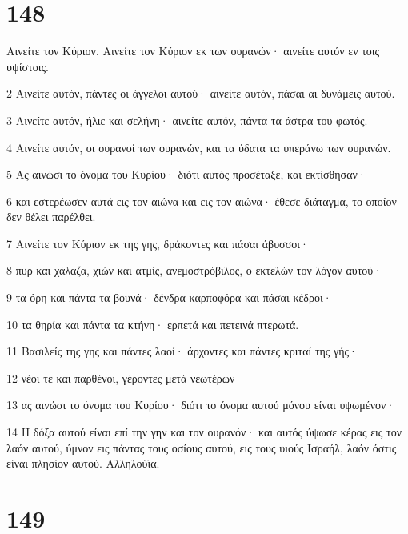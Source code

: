 \chapter{148}

\par Αινείτε τον Κύριον. Αινείτε τον Κύριον εκ των ουρανών· αινείτε αυτόν εν τοις υψίστοις.
\par 2 Αινείτε αυτόν, πάντες οι άγγελοι αυτού· αινείτε αυτόν, πάσαι αι δυνάμεις αυτού.
\par 3 Αινείτε αυτόν, ήλιε και σελήνη· αινείτε αυτόν, πάντα τα άστρα του φωτός.
\par 4 Αινείτε αυτόν, οι ουρανοί των ουρανών, και τα ύδατα τα υπεράνω των ουρανών.
\par 5 Ας αινώσι το όνομα του Κυρίου· διότι αυτός προσέταξε, και εκτίσθησαν·
\par 6 και εστερέωσεν αυτά εις τον αιώνα και εις τον αιώνα· έθεσε διάταγμα, το οποίον δεν θέλει παρέλθει.
\par 7 Αινείτε τον Κύριον εκ της γης, δράκοντες και πάσαι άβυσσοι·
\par 8 πυρ και χάλαζα, χιών και ατμίς, ανεμοστρόβιλος, ο εκτελών τον λόγον αυτού·
\par 9 τα όρη και πάντα τα βουνά· δένδρα καρποφόρα και πάσαι κέδροι·
\par 10 τα θηρία και πάντα τα κτήνη· ερπετά και πετεινά πτερωτά.
\par 11 Βασιλείς της γης και πάντες λαοί· άρχοντες και πάντες κριταί της γής·
\par 12 νέοι τε και παρθένοι, γέροντες μετά νεωτέρων
\par 13 ας αινώσι το όνομα του Κυρίου· διότι το όνομα αυτού μόνου είναι υψωμένον·
\par 14 Η δόξα αυτού είναι επί την γην και τον ουρανόν· και αυτός ύψωσε κέρας εις τον λαόν αυτού, ύμνον εις πάντας τους οσίους αυτού, εις τους υιούς Ισραήλ, λαόν όστις είναι πλησίον αυτού. Αλληλούϊα.

\chapter{149}

